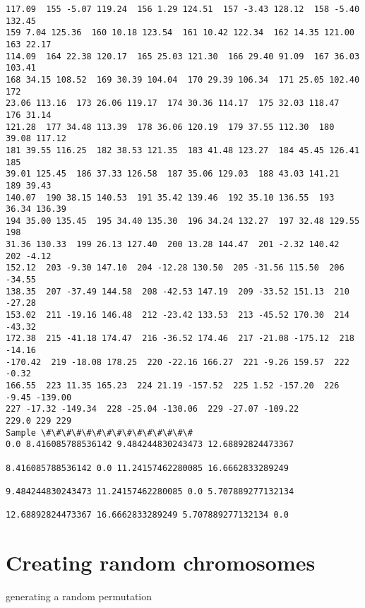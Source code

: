 \documentclass[11pt]{article}
\begin{document}
\begin{Verbatim}[commandchars=\\\{\}]
117.09  155 -5.07 119.24  156 1.29 124.51  157 -3.43 128.12  158 -5.40 132.45
159 7.04 125.36  160 10.18 123.54  161 10.42 122.34  162 14.35 121.00  163 22.17
114.09  164 22.38 120.17  165 25.03 121.30  166 29.40 91.09  167 36.03 103.41
168 34.15 108.52  169 30.39 104.04  170 29.39 106.34  171 25.05 102.40  172
23.06 113.16  173 26.06 119.17  174 30.36 114.17  175 32.03 118.47  176 31.14
121.28  177 34.48 113.39  178 36.06 120.19  179 37.55 112.30  180 39.08 117.12
181 39.55 116.25  182 38.53 121.35  183 41.48 123.27  184 45.45 126.41  185
39.01 125.45  186 37.33 126.58  187 35.06 129.03  188 43.03 141.21  189 39.43
140.07  190 38.15 140.53  191 35.42 139.46  192 35.10 136.55  193 36.34 136.39
194 35.00 135.45  195 34.40 135.30  196 34.24 132.27  197 32.48 129.55  198
31.36 130.33  199 26.13 127.40  200 13.28 144.47  201 -2.32 140.42  202 -4.12
152.12  203 -9.30 147.10  204 -12.28 130.50  205 -31.56 115.50  206 -34.55
138.35  207 -37.49 144.58  208 -42.53 147.19  209 -33.52 151.13  210 -27.28
153.02  211 -19.16 146.48  212 -23.42 133.53  213 -45.52 170.30  214 -43.32
172.38  215 -41.18 174.47  216 -36.52 174.46  217 -21.08 -175.12  218 -14.16
-170.42  219 -18.08 178.25  220 -22.16 166.27  221 -9.26 159.57  222 -0.32
166.55  223 11.35 165.23  224 21.19 -157.52  225 1.52 -157.20  226 -9.45 -139.00
227 -17.32 -149.34  228 -25.04 -130.06  229 -27.07 -109.22
229.0 229 229
Sample \#\#\#\#\#\#\#\#\#\#\#\#\#\#\#
0.0 8.416085788536142 9.484244830243473 12.68892824473367

8.416085788536142 0.0 11.24157462280085 16.6662833289249

9.484244830243473 11.24157462280085 0.0 5.707889277132134

12.68892824473367 16.6662833289249 5.707889277132134 0.0

    \end{Verbatim}

    \hypertarget{creating-random-chromosomes}{%
\section{Creating random
chromosomes}\label{creating-random-chromosomes}}

generating a random permutation
\end{document}
